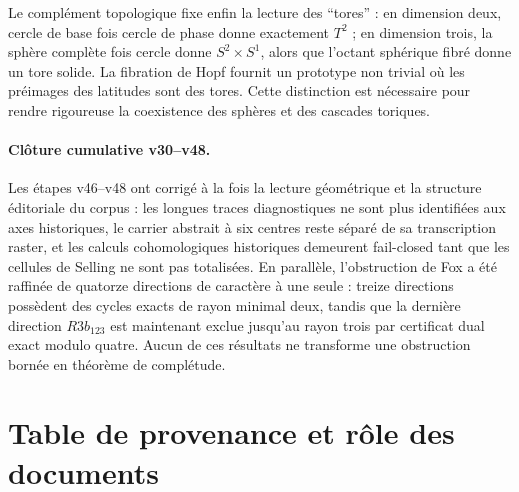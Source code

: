 \documentclass[11pt,a4paper]{article}
\begin{document}
Le complément topologique fixe enfin la lecture des ``tores'' : en dimension deux, cercle de base fois cercle de phase donne exactement $T^2$ ; en dimension trois, la sphère complète fois cercle donne $S^2\times S^1$, alors que l'octant sphérique fibré donne un tore solide. La fibration de Hopf fournit un prototype non trivial où les préimages des latitudes sont des tores. Cette distinction est nécessaire pour rendre rigoureuse la coexistence des sphères et des cascades toriques.

\paragraph{Clôture cumulative v30--v48.}
Les étapes v46--v48 ont corrigé à la fois la lecture géométrique et la structure éditoriale du corpus : les longues traces diagnostiques ne sont plus identifiées aux axes historiques, le carrier abstrait à six centres reste séparé de sa transcription raster, et les calculs cohomologiques historiques demeurent fail-closed tant que les cellules de Selling ne sont pas totalisées. En parallèle, l'obstruction de Fox a été raffinée de quatorze directions de caractère à une seule : treize directions possèdent des cycles exacts de rayon minimal deux, tandis que la dernière direction $R3b_{123}$ est maintenant exclue jusqu'au rayon trois par certificat dual exact modulo quatre. Aucun de ces résultats ne transforme une obstruction bornée en théorème de complétude.


\appendix
\section{Table de provenance et rôle des documents}
\end{document}
